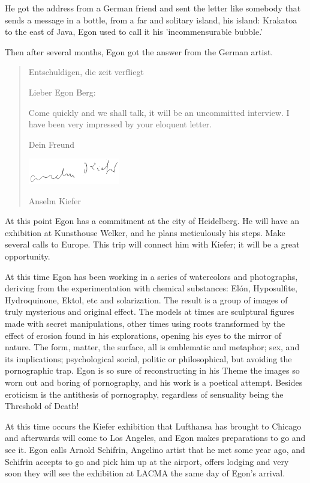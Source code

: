 \documentclass[smalldemyvopaper,11pt,twoside,onecolumn,openright,extrafontsizes]{memoir}
\begin{document}
He got the address from a German friend and sent the letter like somebody that sends a message in a bottle, from a far and solitary island, his island: Krakatoa to the east of Java, Egon used to call it his 'incommensurable bubble.'

Then after several months, Egon got the answer from the German artist. 

\begin{quote}
    Entschuldigen, die zeit verfliegt 

    Lieber Egon Berg:
    
    Come quickly and we shall talk, it will be an uncommitted interview. I have been very impressed by your eloquent letter. 

    Dein Freund

\includegraphics[width=4cm]{./images/anselm}

    Anselm Kiefer
\end{quote}


At this point Egon has a commitment at the city of Heidelberg. He will have an exhibition at Kunsthouse Welker, and he plans meticulously his steps. Make several calls to Europe. This trip will connect him with Kiefer; it will be a great opportunity.

At this time Egon has been working in a series of watercolors and photographs, deriving from the experimentation with chemical substances: Elón, Hyposulfite, Hydroquinone, Ektol, etc and solarization. The result is a group of images of truly mysterious and original effect. The models at times are sculptural figures made with secret manipulations, other times using roots transformed by the effect of erosion found in his explorations, opening his eyes to the mirror of nature. The form, matter, the surface, all is emblematic and metaphor; sex, and its implications; psychological social, politic or philosophical, but avoiding the pornographic trap. Egon is so sure of reconstructing in his Theme the images so worn out and boring of pornography, and his work is a poetical attempt. Besides eroticism is the antithesis of pornography, regardless of sensuality being the Threshold of Death!

At this time occurs the Kiefer exhibition that Lufthansa has brought to Chicago and afterwards will come to Los Angeles, and Egon makes preparations to go and see it. Egon calls Arnold Schifrin, Angelino artist that he met some year ago, and Schifrin accepts to go and pick him up at the airport, offers lodging and very soon they will see the exhibition at LACMA the same day of Egon’s arrival.
\end{document}

